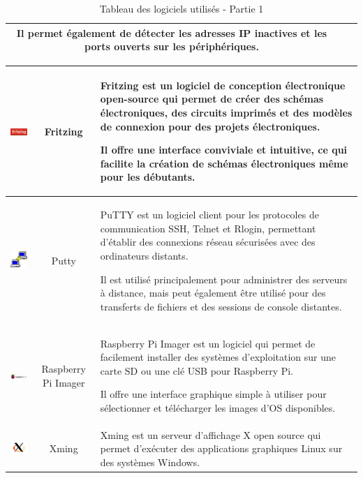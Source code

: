 \begin{table}[H]
\begin{tabular}{|c{3cm}|c{3cm}|l{10cm}|}
Il permet également de détecter les adresses IP inactives et les ports ouverts sur les périphériques.  \\
\hline
\end{tabular}
\caption{Tableau des logiciels utilisés - Partie 1}
\label{1}
\end{table}


\begin{table}[H]
\begin{center}
\begin{tabular}{|c{3cm}|c{3cm}|l{10cm}|}
\hline
\includegraphics[width=3cm]{Images/Logo-Fritzing.png} & Fritzing & Fritzing est un logiciel de conception électronique open-source qui permet de créer des schémas électroniques, des circuits imprimés et des modèles de connexion pour des projets électroniques. 

Il offre une interface conviviale et intuitive, ce qui facilite la création de schémas électroniques même pour les débutants. \\
\hline
\includegraphics[width=3cm]{Images/Logo-Putty.png} & Putty & PuTTY est un logiciel client pour les protocoles de communication SSH, Telnet et Rlogin, permettant d'établir des connexions réseau sécurisées avec des ordinateurs distants. 

Il est utilisé principalement pour administrer des serveurs à distance, mais peut également être utilisé pour des transferts de fichiers et des sessions de console distantes. \\
\hline
\includegraphics[width=3cm]{Images/Logo-Raspberry.png} & Raspberry Pi Imager & Raspberry Pi Imager est un logiciel qui permet de facilement installer des systèmes d'exploitation sur une carte SD ou une clé USB pour Raspberry Pi. 

Il offre une interface graphique simple à utiliser pour sélectionner et télécharger les images d'OS disponibles. \\
\hline
\includegraphics[width=3cm]{Images/xminglogo.png} & Xming & Xming est un serveur d'affichage X open source qui permet d'exécuter des applications graphiques Linux sur des systèmes Windows. 


\end{tabular}
\end{center}
\end{table}
